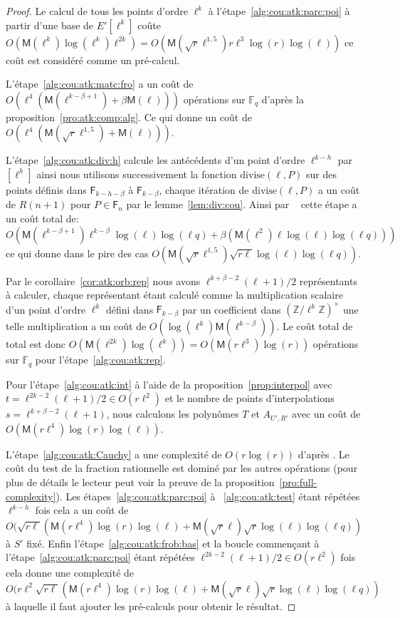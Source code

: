 \documentclass[10pt,a4paper]{book}
\theoremstyle{plain}
\theoremstyle{definition}
\theoremstyle{definition}
\theoremstyle{definition}
\theoremstyle{definition}
\theoremstyle{definition}
\theoremstyle{remark}
\theoremstyle{remark}
\theoremstyle{definition}
\begin{document}
\begin{proof}
Le calcul de tous les points d'ordre $\ell^k$ à 
l'étape~\ref{alg:cou:atk:parc:poi} à partir d'une base de $E'[\ell^k]$ coûte 
$O(\mathsf{M}(\ell^k)\log(\ell^k)\ell^{2k})=
O(\mathsf{M}(\sqrt{r}\ell^{1,5})r\ell^3\log(r)\log(\ell))$ ce coût est considéré comme 
un pré-calcul.

L'étape~\ref{alg:cou:atk:matc:fro} a un coût de 
$O(\ell^4(\mathsf{M}(\ell^{k-\beta+1})+\beta\mathsf{M}(\ell)))$
opérations sur $\mathbb{F}_q$ d'après la proposition~\ref{pro:atk:comp:alg}.
Ce qui donne un coût de $O(\ell^4(\mathsf{M}(\sqrt{r}\ell^{1,5})+\mathsf{M}(\ell)))$.

L'étape~\ref{alg:cou:atk:div:h} calcule les antécédents d'un point d'ordre
$\ell^{k-h}$ par $[\ell^h]$ ainsi nous utilisons successivement la fonction 
$\mathrm{divise}(\ell,P)$ sur des points définis dans $\mathsf{F}_{k-h-\beta}$ à
$\mathsf{F}_{k-\beta}$, chaque itération de $\mathrm{divise}(\ell,P)$ a un coût
de $R(n+1)$ pour $P \in \mathsf{F}_n$ par le lemme~\ref{lem:div:cou}. Ainsi 
par ~\cite[Chapter~14.5]{vzGJG03} cette étape a un coût total de: 
$O(\mathsf{M}(\ell^{k-\beta +1})\ell^{k-\beta}\log(\ell)\log(\ell q)+\beta (\mathsf{M}(\ell^2)\ell\log(\ell)\log(\ell q)))$ 
ce qui donne dans le pire des cas
$O(\mathsf{M}(\sqrt{r}\ell^{1,5})\sqrt{r\ell}\log(\ell)\log(\ell q))$.

Par le corollaire~\ref{cor:atk:orb:rep} nous avons $\ell^{k+\beta-2}(\ell+1)/2$ 
représentants à calculer, chaque représentant étant 
calculé comme la multiplication scalaire d'un point d'ordre $\ell^k$ défini 
dans $\mathsf{F}_{k-\beta}$ par un coefficient dans 
$(\mathbb{Z}/\ell^k\mathbb{Z})^{\times}$ une telle multiplication a un coût
de $O(\log(\ell^k)\mathsf{M}(\ell^{k-\beta}))$. Le coût total de total est donc
$O(\mathsf{M}(\ell^{2k})\log(\ell^k))=O(\mathsf{M}(r\ell^3)\log(r))$ opérations sur 
$\mathbb{F}_q$ pour l'étape~\ref{alg:cou:atk:rep}.

Pour l'étape~\ref{alg:cou:atk:int} à l'aide de la 
proposition~\ref{prop:interpol} avec $t=\ell^{2k-2}(\ell+1)/2 \in O(r\ell^2)$ 
et le nombre de points d'interpolations $s=\ell^{k+\beta-2}(\ell+1)$, nous 
calculons les polynômes $T$ et $A_{U',R'}$ avec un coût de 
$O(\mathsf{M}(r\ell^4)\log(r)\log(\ell))$. 

L'étape~\ref{alg:cou:atk:Cauchy} a une complexité de $O(r\log(r))$ d'après
\cite[Théorème 7.5]{algeff17}. Le coût du test de la fraction rationnelle est
dominé par les autres opérations (pour plus de détails le lecteur peut voir 
la preuve de la proposition~\ref{pro:full-complexity}).
\sloppy
Les étapes~\ref{alg:cou:atk:parc:poi} à ~\ref{alg:cou:atk:test} étant répétées 
$\ell^{k-h}$ fois cela a un coût de 
$O(\sqrt{r \ell}(\mathsf{M}(r\ell^4)\log(r)\log(\ell)+\mathsf{M}(\sqrt{r}\ell)\sqrt{r}\log(\ell)\log(\ell q))$ 
à $S'$ fixé.
\fussy
Enfin l'étape~\ref{alg:cou:atk:frob:bas} et la boucle commençant à 
l'étape~\ref{alg:cou:atk:parc:poi} étant répétées $\ell^{2k-2}(\ell+1)/2 \in 
O(r\ell^2)$ fois cela donne une complexité de $O(r \ell^2 \sqrt{r \ell}(\mathsf{M}(r\ell^4)\log(r)\log(\ell)+\mathsf{M}(\sqrt{r}\ell)\sqrt{r}\log(\ell)\log(\ell q))$ à laquelle il faut ajouter les pré-calculs pour obtenir le résultat.
\end{proof}
\end{document}
